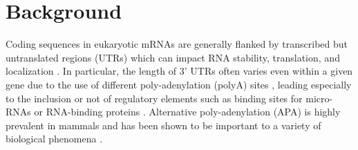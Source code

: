 \documentclass{bmcart}
\begin{document}
\begin{frontmatter}
\begin{abstractbox}
\begin{keyword}
\end{keyword}


\end{abstractbox}
%

\end{frontmatter}



\section*{Background}

Coding sequences in eukaryotic mRNAs are generally flanked by transcribed but untranslated regions (UTRs) which can impact RNA stability, translation, and localization \cite{Lewis1995TheMetabolism}. In particular, the length of 3' UTRs often varies even within a given gene due to the use of different poly-adenylation (polyA) sites \cite{Tian2016AlternativePrecursors}, leading especially to the inclusion or not of regulatory elements such as binding sites for micro-RNAs or RNA-binding proteins \cite{Fabian2010RegulationMicroRNAs}. Alternative poly-adenylation (APA) is highly prevalent in mammals \cite{Derti2012AMammals} and has been shown to be important to a variety of biological phenomena \cite{Sandberg2008ProliferatingSites,Mayr2009WidespreadCells,Miura2013WidespreadBrain, Ha2018QAPA:Data}.
\end{document}
